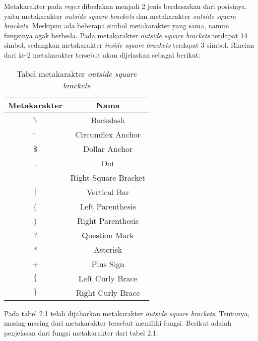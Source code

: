 Metakarakter pada \textit{regex} dibedakan menjadi 2 jenis berdasarkan dari posisinya, yaitu metakarakter \textit{outside square brackets} dan metakarakter \textit{outside square brackets}. Meskipun ada beberapa simbol metakarakter yang sama, namun fungsinya agak berbeda. Pada metakarakter \textit{outside square brackets} terdapat 14 simbol, sedangkan metakarakter \textit{inside square brackets} terdapat 3 simbol. Rincian dari ke-2 metakarakter tersebut akan dijelaskan sebagai berikut:
	
\begin{table}[H]
	\caption {Tabel metakarakter \textit{outside square brackets}} \label{tab:metacharacters-outside}
	\begin{center}
		\begin{tabular}{|c|c|}
		\hline 
		Metakarakter & Nama \\ 
		\hline 
		$\backslash$ & Backslash \\ 
		\hline 
		$\hat{}$ & Circumflex Anchor\\ 
		\hline 
		\$ & Dollar Anchor\\ 
		\hline 
		. & Dot \\ 
		\hline 
		[ & Left Square Bracket \\ 
		\hline 
		] & Right Square Bracket \\ 
		\hline 
		$\vert$ & Vertical Bar \\ 
		\hline 
		( & Left Parenthesis \\ 
		\hline 
		) & Right Parenthesis \\ 
		\hline 
		? & Question Mark \\ 
		\hline 
		* & Asterisk \\ 
		\hline 
		+ & Plus Sign \\ 
		\hline 
		$\lbrace$ & Left Curly Brace \\ 
		\hline 
		$\rbrace$ & Right Curly Brace \\ 
		\hline 
		\end{tabular} 
	\end{center}
\end{table}

Pada tabel 2.1 telah dijabarkan metakarakter \textit{outside square brackets}. Tentunya, masing-masing dari metakarakter tersebut memiliki fungsi. Berikut adalah penjelasan dari fungsi metakarakter dari tabel 2.1:

